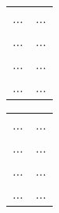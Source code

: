 \addchap{\lsAbbreviationsTitle}

\begin{multicols}{2} 


\begin{tabular}{lp{4.5cm}} 
...        &    ... \\
...        &    ... \\
...        &    ... \\
...        &    ... \\
\end{tabular}
%
\begin{tabular}{lp{4.5cm}} 
...        &    ... \\
...        &    ... \\
...        &    ... \\
...        &    ... \\
\end{tabular}

 
\end{multicols} 